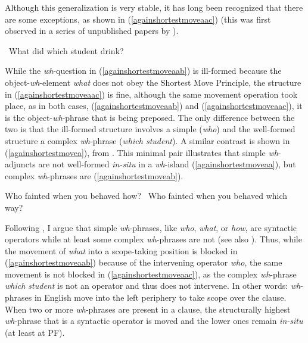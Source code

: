\noindent Although this generalization is very stable, it has long been recognized that there are some exceptions, as shown in (\ref{againshortestmoveaac}) (this was first observed in a series of unpublished papers by \citealt{reinhart1986mimeo, reinhart1987mimeo, reinhart1990mimeo}).

\begin{exe}
\ex \textcolor{white}{*}What did which student drink? \label{againshortestmoveaac}
\end{exe}

\noindent While the \textit{wh}-question in (\ref{againshortestmoveaab}) is ill-formed because the object-\textit{wh}-element \textit{what} does not obey the Shortest Move Principle, the structure in (\ref{againshortestmoveaac}) is fine, although the same movement operation took place, as in both cases, (\ref{againshortestmoveaab}) and (\ref{againshortestmoveaac}), it is the object-\textit{wh}-phrase that is being preposed. The only difference between the two is that the ill-formed structure involves a simple (\textit{who}) and the well-formed structure a complex \textit{wh}-phrase (\textit{which student}). A similar contrast is shown in (\ref{againshortestmovea}), from \citet[4--5]{reinhart1990mimeo}. This minimal pair illustrates that simple \textit{wh}-adjuncts are not well-formed \textit{in-situ} in a \textit{wh}-island (\ref{againshortestmoveaa}), but complex \textit{wh}-phrases are (\ref{againshortestmoveab}). 

\begin{exe}
\ex\label{againshortestmovea}\begin{xlist}
\ex *Who fainted when you behaved how? \label{againshortestmoveaa}
\ex \textcolor{white}{*}Who fainted when you behaved which way? \label{againshortestmoveab}
\end{xlist}
\end{exe}

\noindent Following \citet{van2010complex}, I argue that simple \textit{wh}-phrases, like \textit{who}, \textit{what}, or \textit{how}, are syntactic operators while at least some complex \textit{wh}-phrases are not (see also \citealt{cinque1986bare, pesetsky1987wh, dobrovie1990clitic, grewendorf2012wh}). Thus, while the movement of \textit{what} into a scope-taking position is blocked in (\ref{againshortestmoveaab}) because of the intervening operator \textit{who}, the same movement is not blocked in (\ref{againshortestmoveaac}), as the complex \textit{wh}-phrase \textit{which student} is not an operator and thus does not intervene. In other words: \textit{wh}-phrases in English move into the left periphery to take scope over the clause. When two or more \textit{wh}-phrases are present in a clause, the structurally highest \textit{wh}-phrase that is a syntactic operator is moved and the lower ones remain \textit{in-situ} (at least at PF).  

